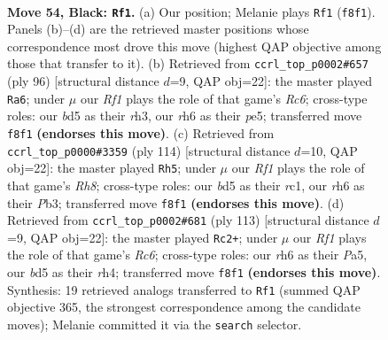 \documentclass[11pt]{article}
\begin{document}
\clearpage

\begin{figure}[p]\centering
\begin{subfigure}{0.46\textwidth}\centering
\resizebox{\linewidth}{!}{%
\newchessgame
\chessboard[
  setfen={5r2/1Pk5/7R/3B4/8/4K3/8/8 b - - 2 54},
  showmover=false,
  pgfstyle=straightmove, color=movearrow, markmove={f8-f1}
]}
\caption{}
\end{subfigure}\hfill
\begin{subfigure}{0.46\textwidth}\centering
\resizebox{\linewidth}{!}{%
\newchessgame
\chessboard[
  setfen={8/8/2R5/4p1Kp/1k6/7r/8/8 w - - 16 49},
  showmover=false,
  pgfstyle=straightmove, color=movearrow, markmove={c6-a6}
]}
\caption{}
\end{subfigure}
\\[4pt]
\begin{subfigure}{0.46\textwidth}\centering
\resizebox{\linewidth}{!}{%
\newchessgame
\chessboard[
  setfen={7R/3k4/8/8/8/1PpK4/8/2r5 w - - 16 58},
  showmover=false,
  pgfstyle=straightmove, color=movearrow, markmove={h8-h5}
]}
\caption{}
\end{subfigure}\hfill
\begin{subfigure}{0.46\textwidth}\centering
\resizebox{\linewidth}{!}{%
\newchessgame
\chessboard[
  setfen={8/8/8/p4k2/5P1R/2r5/5K2/8 b - - 16 57},
  showmover=false,
  pgfstyle=straightmove, color=movearrow, markmove={c3-c2}
]}
\caption{}
\end{subfigure}
\caption{\textbf{Move 54, Black: \texttt{Rf1}.} (a) Our position; Melanie plays \texttt{Rf1} (\texttt{f8f1}). Panels (b)--(d) are the retrieved master positions whose correspondence most drove this move (highest QAP objective among those that transfer to it). (b) Retrieved from \texttt{ccrl\_top\_p0002\#657} (ply 96) [structural distance $d$=9, QAP obj=22]: the master played \texttt{Ra6}; under $\mu$ our \emph{Rf1} plays the role of that game's \emph{Rc6}; cross-type roles: our \emph{b}d5 as their \emph{r}h3, our \emph{r}h6 as their \emph{p}e5; transferred move \texttt{f8f1} \textbf{(endorses this move)}. (c) Retrieved from \texttt{ccrl\_top\_p0000\#3359} (ply 114) [structural distance $d$=10, QAP obj=22]: the master played \texttt{Rh5}; under $\mu$ our \emph{Rf1} plays the role of that game's \emph{Rh8}; cross-type roles: our \emph{b}d5 as their \emph{r}c1, our \emph{r}h6 as their \emph{P}b3; transferred move \texttt{f8f1} \textbf{(endorses this move)}. (d) Retrieved from \texttt{ccrl\_top\_p0002\#681} (ply 113) [structural distance $d$=9, QAP obj=22]: the master played \texttt{Rc2+}; under $\mu$ our \emph{Rf1} plays the role of that game's \emph{Rc6}; cross-type roles: our \emph{r}h6 as their \emph{P}a5, our \emph{b}d5 as their \emph{r}h4; transferred move \texttt{f8f1} \textbf{(endorses this move)}. Synthesis: 19 retrieved analogs transferred to \texttt{Rf1} (summed QAP objective 365, the strongest correspondence among the candidate moves); Melanie committed it via the \texttt{search} selector.}
\label{fig:thought-m107}
\end{figure}
\end{document}
